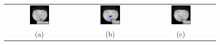 \begin{figure}[h!]
	\begin{center}
		\vspace{0.4cm}
		{
			\begin{tabular}{ccc}
				\includegraphics[width=0.3\textwidth]{Bulgular-Irdeleme/Figures/unpp2d1.pdf} & \includegraphics[width=0.3\textwidth]{Bulgular-Irdeleme/Figures/unpp2d2.pdf} & \includegraphics[width=0.3\textwidth]{Bulgular-Irdeleme/Figures/unpp2d3.pdf} \\
				(a) & (b) & (c)\\

\end{tabular}}
\end{center}
\end{figure}
